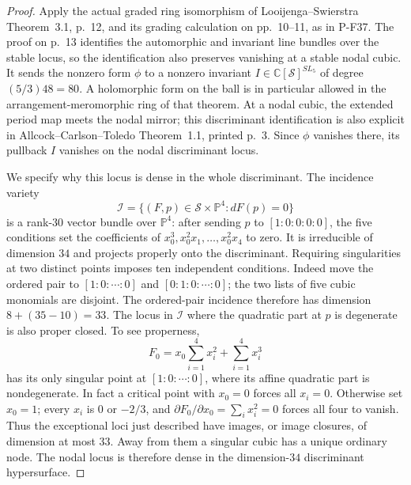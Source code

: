 \documentclass[11pt,a4paper]{article}
\begin{document}
\begin{proof}
Apply the actual graded ring isomorphism of
Looijenga--Swierstra Theorem~3.1, p.~12, and its grading
calculation on pp.~10--11, as in P-F37. The proof on p.~13
identifies the automorphic and invariant line bundles over
the stable locus, so the identification also preserves
vanishing at a stable nodal cubic.
It sends the nonzero form $\phi$ to a nonzero invariant
$I\in\mathbb C[\mathscr S]^{SL_5}$ of degree
$(5/3)48=80$. A holomorphic form on the ball is in particular
allowed in the arrangement-meromorphic ring of that theorem.
At a nodal cubic, the extended period map meets the nodal
mirror; this discriminant identification is also explicit
in Allcock--Carlson--Toledo Theorem~1.1, printed p.~3.
Since $\phi$ vanishes there, its pullback $I$
vanishes on the nodal discriminant locus.

We specify why this locus is dense in the whole discriminant.
The incidence variety
\[
 \mathscr I=\{(F,p)\in\mathscr S\times\mathbb P^4:
                         dF(p)=0\}
\]
is a rank-$30$ vector bundle over $\mathbb P^4$: after sending
$p$ to $[1:0:0:0:0]$, the five conditions set the coefficients
of $x_0^3,x_0^2x_1,\ldots,x_0^2x_4$ to zero.
It is irreducible of dimension $34$ and projects properly
onto the discriminant. Requiring singularities at two
distinct points imposes ten independent conditions. Indeed
move the ordered pair to $[1:0:\cdots:0]$ and
$[0:1:0:\cdots:0]$; the two lists of five cubic monomials
are disjoint. The ordered-pair incidence therefore has
dimension $8+(35-10)=33$.
The locus in $\mathscr I$ where the quadratic part at $p$
is degenerate is also proper closed. To see properness,
\[
        F_0=x_0\sum_{i=1}^4x_i^2+\sum_{i=1}^4x_i^3
 \tag{P-F41d}
\]
has its only singular point at $[1:0:\cdots:0]$, where its
affine quadratic part is nondegenerate. In fact a critical
point with $x_0=0$ forces all $x_i=0$. Otherwise set
$x_0=1$; every $x_i$ is $0$ or $-2/3$, and
$\partial F_0/\partial x_0=\sum_i x_i^2=0$ forces
all four to vanish. Thus the exceptional loci just described
have images, or image closures, of dimension at most $33$.
Away from them a singular cubic has a unique ordinary node.
The nodal locus is therefore dense in the dimension-$34$
discriminant hypersurface.


\end{proof}
\end{document}
